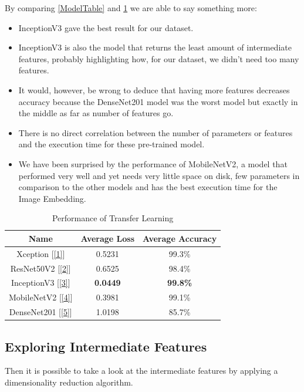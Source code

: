 \documentclass[conference]{IEEEtran}
\begin{document}
By comparing \ref{ModelTable} and \ref{ResTable} we are able to say something more:
\begin{itemize}
\item{InceptionV3 gave the best result for our dataset.}
\item{InceptionV3 is also the model that returns the least amount of intermediate features, probably highlighting how, for our dataset, we didn't need too many features.}
\item{It would, however, be wrong to deduce that having more features decreases accuracy because the DenseNet201 model was the worst model but exactly in the middle as far as number of features go.}
\item{There is no direct correlation between the number of parameters or features and the execution time for these pre-trained model.}
\item{We have been surprised by the performance of MobileNetV2, a model that performed very well and yet needs very little space on disk, few parameters in comparison to the other models and has the best execution time for the Image Embedding.}
\end{itemize}

\begin{table}[htbp]
\caption{Performance of Transfer Learning}
\begin{center}
\begin{tabular}{|c|c|c|}
\hline
\textbf{Name} &\textbf{Average Loss} &\textbf{Average Accuracy}\\
\hline
\hline
Xception [\ref{1}] & 0.5231 & 99.3\%\\
\hline
ResNet50V2 [\ref{2}] & 0.6525 & 98.4\%\\
\hline
InceptionV3 [\ref{3}] & \textbf{0.0449} & \textbf{99.8\%}\\
\hline
MobileNetV2 [\ref{4}] & 0.3981 & 99.1\%\\
\hline
DenseNet201 [\ref{5}] & 1.0198 & 85.7\%\\
\hline
\end{tabular}
\label{ResTable}
\end{center}
\end{table}

\subsection{Exploring Intermediate Features}
Then it is possible to take a look at the intermediate features by applying a dimensionality reduction algorithm.
\end{document}

